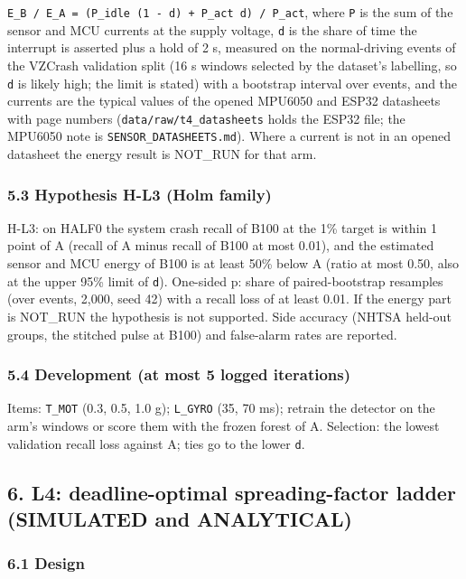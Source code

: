 \texttt{E\_B / E\_A = (P\_idle (1 - d) + P\_act d) / P\_act}, where \texttt{P} is the sum of the sensor and MCU currents at the supply voltage, \texttt{d} is the share of time the interrupt is asserted plus a hold of 2 s, measured on the normal-driving events of the VZCrash validation split (16 s windows selected by the dataset's labelling, so \texttt{d} is likely high; the limit is stated) with a bootstrap interval over events, and the currents are the typical values of the opened MPU6050 and ESP32 datasheets with page numbers (\texttt{data/raw/t4\_datasheets} holds the ESP32 file; the MPU6050 note is \texttt{SENSOR\_DATASHEETS.md}). Where a current is not in an opened datasheet the energy result is NOT\_RUN for that arm.

\subsubsection*{5.3 Hypothesis H-L3 (Holm family)}

H-L3: on HALF0 the system crash recall of B100 at the 1\% target is within 1 point of A (recall of A minus recall of B100 at most 0.01), and the estimated sensor and MCU energy of B100 is at least 50\% below A (ratio at most 0.50, also at the upper 95\% limit of \texttt{d}). One-sided p: share of paired-bootstrap resamples (over events, 2,000, seed 42) with a recall loss of at least 0.01. If the energy part is NOT\_RUN the hypothesis is not supported. Side accuracy (NHTSA held-out groups, the stitched pulse at B100) and false-alarm rates are reported.

\subsubsection*{5.4 Development (at most 5 logged iterations)}

Items: \texttt{T\_MOT} (0.3, 0.5, 1.0 g); \texttt{L\_GYRO} (35, 70 ms); retrain the detector on the arm's windows or score them with the frozen forest of A. Selection: the lowest validation recall loss against A; ties go to the lower \texttt{d}.

\subsection*{6. L4: deadline-optimal spreading-factor ladder (SIMULATED and ANALYTICAL)}

\subsubsection*{6.1 Design}

